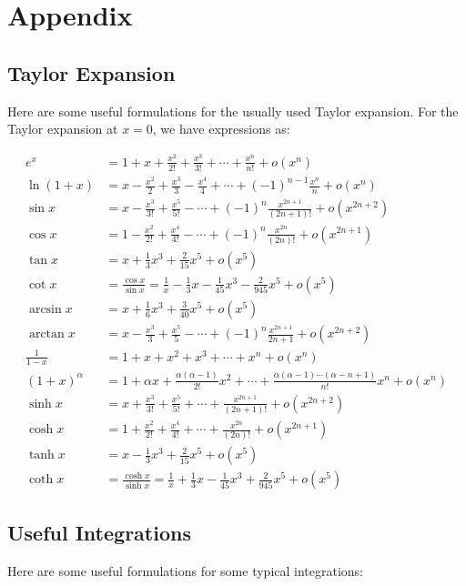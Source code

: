 \documentclass[../main.tex]{subfiles}
\begin{document}
\section{\textbf{Appendix}}

\subsection{Taylor Expansion}

Here are some useful formulations for the usually used Taylor expansion. For the Taylor expansion at $x = 0$, we have expressions as:

\begin{align}
    e^x &= 1 + x + \frac{x^2}{2!} + \frac{x^3}{3!} + \cdots + \frac{x^n}{n!} + o(x^n)\\
    \ln(1+x) &= x - \frac{x^2}{2} + \frac{x^3}{3} - \frac{x^4}{4} + \cdots + (-1)^{n-1}\frac{x^n}{n} + o(x^n)\\
    \sin x &= x - \frac{x^3}{3!} + \frac{x^5}{5!} - \cdots + (-1)^n \frac{x^{2n+1}}{(2n+1)!} + o(x^{2n+2})\\
    \cos x &= 1 - \frac{x^2}{2!} + \frac{x^4}{4!} - \cdots + (-1)^n \frac{x^{2n}}{(2n)!} + o(x^{2n+1})\\
    \tan x &= x + \frac{1}{3}x^3 + \frac{2}{15}x^5 + o(x^5)\\
    \cot x &= \frac{\cos x}{\sin x} = \frac{1}{x} - \frac{1}{3}x - \frac{1}{45}x^3 - \frac{2}{945}x^5 + o(x^5)\\
    \arcsin x &= x + \frac{1}{6}x^3 + \frac{3}{40}x^5 + o(x^5)\\
    \arctan x &= x - \frac{x^3}{3} + \frac{x^5}{5} - \cdots + (-1)^n \frac{x^{2n+1}}{2n+1} + o(x^{2n+2})\\
    \frac{1}{1-x} &= 1 + x + x^2 + x^3 + \cdots + x^n + o(x^n)\\
    (1+x)^\alpha &= 1 + \alpha x + \frac{\alpha(\alpha-1)}{2!}x^2 + \cdots + \frac{\alpha(\alpha-1)\cdots(\alpha-n+1)}{n!}x^n + o(x^n)\\
    \sinh x &= x + \frac{x^3}{3!} + \frac{x^5}{5!} + \cdots + \frac{x^{2n+1}}{(2n+1)!} + o(x^{2n+2})\\
    \cosh x &= 1 + \frac{x^2}{2!} + \frac{x^4}{4!} + \cdots + \frac{x^{2n}}{(2n)!} + o(x^{2n+1})\\
    \tanh x &= x - \frac{1}{3}x^3 + \frac{2}{15}x^5 + o(x^5)\\
    \coth x &= \frac{\cosh x}{\sinh x} = \frac{1}{x} + \frac{1}{3}x - \frac{1}{45}x^3 + \frac{2}{945}x^5 + o(x^5)
\end{align}

\subsection{Useful Integrations}

Here are some useful formulations for some typical integrations:
\end{document}
